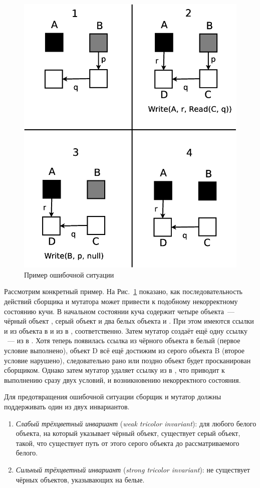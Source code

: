 \begin{figure}[h!]
\centering
\includegraphics[width=0.4\linewidth]{Moiseenko/images/inc_marking.eps}
\caption{Пример ошибочной ситуации}
\label{fig:inc_marking}
\end{figure}

Рассмотрим конкретный пример. На Рис.~\ref{fig:inc_marking} показано, как последовательность 
действий сборщика и мутатора может привести к подобному некорректному состоянию кучи. 
В начальном состоянии куча содержит четыре объекта~--- чёрный объект , 
серый объект  и два белых объекта  и .
При этом имеются ссылки  и  из объекта  в  и из 
 в , соответственно. 
Затем мутатор создаёт ещё одну ссылку ~--- из  в . 
Хотя теперь появилась ссылка из чёрного объекта в белый (первое условие выполнено), 
объект D всё ещё достижим из серого объекта B (второе условие нарушено), следовательно 
рано или поздно объект  будет просканирован сборщиком. 
Однако затем мутатор удаляет ссылку из  в , что приводит к 
выполнению сразу двух условий, и возникновению некорректного состояния.

Для предотвращения ошибочной ситуации сборщик и мутатор должны поддерживать один из двух 
инвариантов.

\begin{enumerate}
\item 
	\emph{Слабый трёхцветный инвариант} (\emph{weak tricolor invariant}): для любого 
	белого объекта, на который указывает чёрный объект, существует серый объект, такой, 
	что существует путь от этого серого объекта до рассматриваемого белого.
\item 
	\emph{Сильный трёхцветный инвариант} (\emph{strong tricolor invariant}): не существует 
	чёрных объектов, указывающих на белые.
\end{enumerate}

